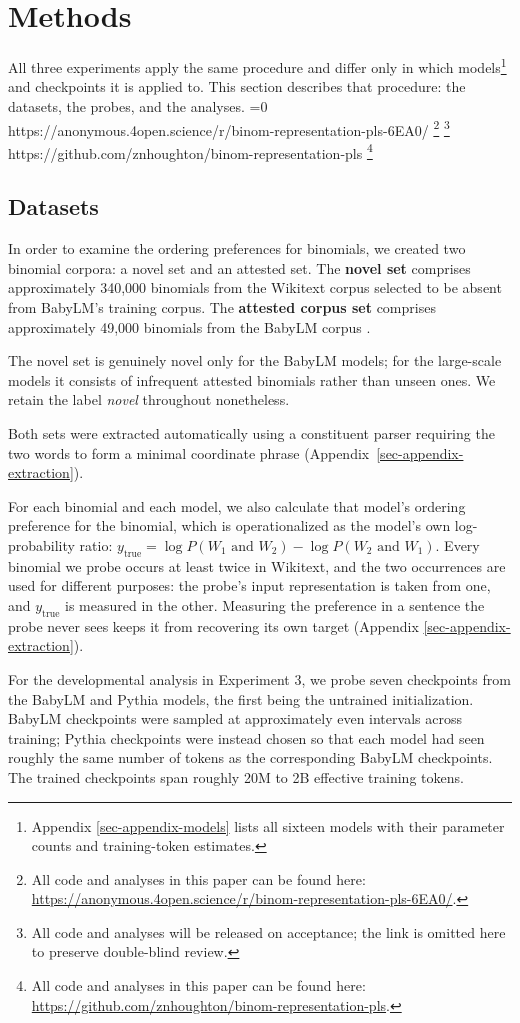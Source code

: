 \documentclass[11pt]{article}
\newcommand{\coderepourl}{https://github.com/znhoughton/binom-representation-pls}
\newcommand{\anoncoderepourl}{https://anonymous.4open.science/r/binom-representation-pls-6EA0/}
\newcommand{\aclmodename}{review}
\newcommand{\codefootnote}{%
  \ifnum\pdfstrcmp{\aclmodename}{review}=0
    \ifdefined\anoncoderepourl
      \footnote{All code and analyses in this paper can be found here: \url{\anoncoderepourl}.}%
    \else
      \footnote{All code and analyses will be released on acceptance; the link is
        omitted here to preserve double-blind review.}%
    \fi
  \else
    \ifdefined\coderepourl
      \footnote{All code and analyses in this paper can be found here: \url{\coderepourl}.}%
    \fi
  \fi}
\begin{document}
\section{Methods}\label{sec-methods}

All three experiments apply the same procedure and differ only in which
models\footnote{Appendix \ref{sec-appendix-models} lists all sixteen
  models with their parameter counts and training-token estimates.} and
checkpoints it is applied to. This section describes that procedure: the
datasets, the probes, and the analyses.\codefootnote

\subsection{Datasets}\label{datasets}

In order to examine the ordering preferences for binomials, we created
two binomial corpora: a novel set and an attested set. The \textbf{novel
set} comprises approximately 340,000 binomials from the Wikitext corpus
\citep{merity2016pointer} selected to be absent from BabyLM's training
corpus. The \textbf{attested corpus set} comprises approximately 49,000
binomials from the BabyLM corpus \citep{warstadt-etal-2023-findings}.

The novel set is genuinely novel only for the BabyLM models; for the
large-scale models it consists of infrequent attested binomials rather
than unseen ones. We retain the label \emph{novel} throughout
nonetheless.

Both sets were extracted automatically using a constituent parser
requiring the two words to form a minimal coordinate phrase
(Appendix~\ref{sec-appendix-extraction}).

For each binomial and each model, we also calculate that model's
ordering preference for the binomial, which is operationalized as the
model's own log-probability ratio:
\(y_{\text{true}} = \log P(W_1\text{ and }W_2) - \log P(W_2\text{ and }W_1)\).
Every binomial we probe occurs at least twice in Wikitext, and the two
occurrences are used for different purposes: the probe's input
representation is taken from one, and \(y_{\text{true}}\) is measured in
the other. Measuring the preference in a sentence the probe never sees
keeps it from recovering its own target (Appendix
\ref{sec-appendix-extraction}).

For the developmental analysis in Experiment 3, we probe seven
checkpoints from the BabyLM and Pythia models, the first being the
untrained initialization. BabyLM checkpoints were sampled at
approximately even intervals across training; Pythia checkpoints were
instead chosen so that each model had seen roughly the same number of
tokens as the corresponding BabyLM checkpoints. The trained checkpoints
span roughly 20M to 2B effective training tokens.
\end{document}
